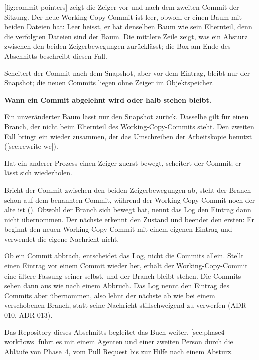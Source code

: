{[fig:commit-pointers] zeigt die Zeiger vor und nach dem zweiten Commit der Sitzung.
Der neue Working-Copy-Commit ist leer, obwohl er einen Baum mit beiden Dateien hat:
Leer heisst, er hat denselben Baum wie sein Elternteil,
denn die verfolgten Dateien sind der Baum.
Die mittlere Zeile zeigt, was ein Absturz zwischen den beiden Zeigerbewegungen zurücklässt;
die Box am Ende des Abschnitts beschreibt diesen Fall.

\startplacefigure[title={Zeiger vor und nach \type{commit}, mit einem Absturz dazwischen},
    reference=fig:commit-pointers,location=here]
\stopplacefigure

Scheitert der Commit nach dem Snapshot, aber vor dem Eintrag, bleibt nur der Snapshot;
die neuen Commits liegen ohne Zeiger im Objektspeicher.

\startinfobox
{\bf Wann ein Commit abgelehnt wird oder halb stehen bleibt.}
\startitemize
\item Ein unveränderter Baum lässt nur den Snapshot zurück.
Dasselbe gilt für einen Branch, der nicht beim Elternteil des Working-Copy-Commits steht.
Den zweiten Fall bringt ein  wieder zusammen,
der das Umschreiben der Arbeitskopie benutzt ([sec:rewrite-wc]).
\item Hat ein anderer Prozess einen Zeiger zuerst bewegt, scheitert der Commit;
er lässt sich wiederholen.
\item Bricht der Commit zwischen den beiden Zeigerbewegungen ab,
steht der Branch schon auf dem benannten Commit,
während der Working-Copy-Commit noch der alte ist ().
Obwohl der Branch sich bewegt hat, nennt das Log den Eintrag dann nicht übernommen.
Der nächste  erkennt den Zustand und beendet den ersten:
Er beginnt den neuen Working-Copy-Commit mit einem eigenen Eintrag
und verwendet die eigene Nachricht nicht.
\item Ob ein Commit abbrach, entscheidet das Log, nicht die Commits allein.
Stellt  einen Eintrag vor einem Commit wieder her,
erhält der Working-Copy-Commit eine ältere Fassung seiner selbst, und der Branch bleibt stehen.
Die Commits sehen dann aus wie nach einem Abbruch.
Das Log nennt den Eintrag des Commits aber übernommen,
also lehnt der nächste  ab wie bei einem verschobenen Branch,
statt seine Nachricht stillschweigend zu verwerfen (ADR-010, ADR-013).
\stopitemize
\stopinfobox

Das Repository  dieses Abschnitts begleitet das Buch weiter.
[sec:phase4-workflows] führt es mit einem Agenten und einer zweiten Person
durch die Abläufe von Phase~4, vom Pull Request bis zur Hilfe nach einem Absturz.

}
